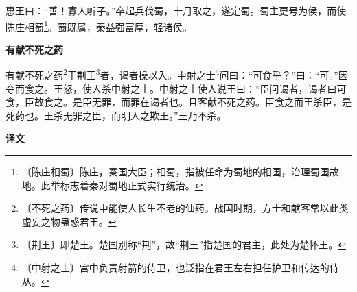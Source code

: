 \documentclass[12pt,UTF-8,openany,a4]{ctexbook}
\begin{document}
\begin{large}
    惠王曰：“善！寡人听子。”卒起兵伐蜀，十月取之，遂定蜀。蜀主更号为侯，而使陈庄相蜀\footnote{〔陈庄相蜀〕\yiwen 陈庄，秦国大臣；相蜀，指被任命为蜀地的相国，治理蜀国故地。此举标志着秦对蜀地正式实行统治。}。蜀既属，秦益强富厚，轻诸侯。
    
    \begin{center}{\Large\textbf{有献不死之药}}\end{center}
    
    有献不死之药\footnote{〔不死之药〕\yiwen 传说中能使人长生不老的仙药。战国时期，方士和献客常以此类虚妄之物蛊惑君王。}于荆王\footnote{〔荆王〕\yiwen 即楚王。楚国别称“荆”，故“荆王”指楚国的君主，此处为楚怀王。}者，谒者操以入。中射之士\footnote{〔中射之士〕\yiwen 宫中负责射箭的侍卫，也泛指在君王左右担任护卫和传达的侍从。}问曰：“可食乎？”曰：“可。”因夺而食之。王怒，使人杀中射之士。中射之士使人说王曰：“臣问谒者，谒者曰可食，臣故食之。是臣无罪，而罪在谒者也。且客献不死之药。臣食之而王杀臣，是死药也。王杀无罪之臣，而明人之欺王。”王乃不杀。
\end{large}


\newpage

\begin{Large}
    \noindent\textbf{译文}
\end{Large}


\vspace{1em}
\end{document}
